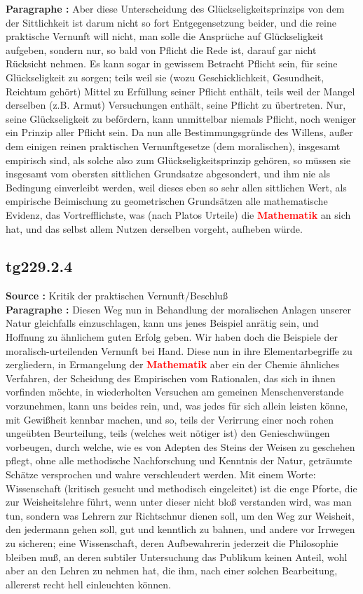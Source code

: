 \documentclass[a4paper,12pt,twoside]{book}
\newcommand{\match}[1]{\textcolor{red}{\textbf{#1}}}
\begin{document}
	\textbf{Paragraphe : }Aber diese Unterscheidung des Glückseligkeitsprinzips von dem der Sittlichkeit ist darum nicht so fort Entgegensetzung beider, und die reine praktische Vernunft will nicht, man solle die Ansprüche auf Glückseligkeit aufgeben, sondern nur, so bald von Pflicht die Rede ist, darauf gar nicht Rücksicht nehmen. Es kann sogar in gewissem Betracht Pflicht sein, für seine Glückseligkeit zu sorgen; teils weil sie (wozu Geschicklichkeit, Gesundheit, Reichtum gehört) Mittel zu Erfüllung seiner Pflicht enthält, teils weil der Mangel derselben (z.B. Armut) Versuchungen enthält, seine Pflicht zu übertreten. Nur, seine Glückseligkeit zu befördern,  kann unmittelbar niemals Pflicht, noch weniger ein Prinzip aller Pflicht sein. Da nun alle Bestimmungsgründe des Willens, außer dem einigen reinen praktischen Vernunftgesetze (dem moralischen), insgesamt empirisch sind, als solche also zum Glückseligkeitsprinzip gehören, so müssen sie insgesamt vom obersten sittlichen Grundsatze abgesondert, und ihm nie als Bedingung einverleibt werden, weil dieses eben so sehr allen sittlichen Wert, als empirische Beimischung zu geometrischen Grundsätzen alle mathematische Evidenz, das Vortrefflichste, was (nach Platos Urteile) die \match{Mathematik} an sich hat, und das selbst allem Nutzen derselben vorgeht, aufheben würde. 
	
	\subsection*{tg229.2.4} 
	\textbf{Source : }Kritik der praktischen Vernunft/Beschluß\\  
	
	\textbf{Paragraphe : }Diesen Weg nun in Behandlung der moralischen Anlagen unserer Natur gleichfalls einzuschlagen, kann uns jenes Beispiel anrätig sein, und Hoffnung zu ähnlichem guten Erfolg geben. Wir haben doch die Beispiele der moralisch-urteilenden Vernunft bei Hand. Diese nun in ihre Elementarbegriffe zu zergliedern, in Ermangelung der \match{Mathematik} aber ein der Chemie ähnliches Verfahren, der Scheidung des Empirischen vom Rationalen, das sich in ihnen vorfinden  möchte, in wiederholten Versuchen am gemeinen Menschenverstande vorzunehmen, kann uns beides rein, und, was jedes für sich allein leisten könne, mit Gewißheit kennbar machen, und so, teils der Verirrung einer noch rohen ungeübten Beurteilung, teils (welches weit nötiger ist) den Genieschwüngen vorbeugen, durch welche, wie es von Adepten des Steins der Weisen zu geschehen pflegt, ohne alle methodische Nachforschung und Kenntnis der Natur, geträumte Schätze versprochen und wahre verschleudert werden. Mit einem Worte: Wissenschaft (kritisch gesucht und methodisch eingeleitet) ist die enge Pforte, die zur Weisheitslehre führt, wenn unter dieser nicht bloß verstanden wird, was man tun, sondern was Lehrern zur Richtschnur dienen soll, um den Weg zur Weisheit, den jedermann gehen soll, gut und kenntlich zu bahnen, und andere vor Irrwegen zu sicheren; eine Wissenschaft, deren Aufbewahrerin jederzeit die Philosophie bleiben muß, an deren subtiler Untersuchung das Publikum keinen Anteil, wohl aber an den Lehren zu nehmen hat, die ihm, nach einer solchen Bearbeitung, allererst recht hell einleuchten können. 
	
\end{document}
